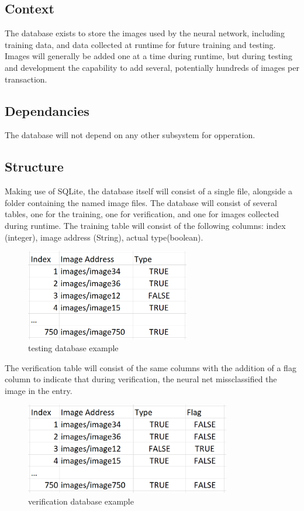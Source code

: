 \subsection{Context}
The database exists to store the images used by the neural network, including training data, and data collected at runtime for future training and testing. 
Images will generally be added one at a time during runtime, but during testing and development the capability to add several, potentially hundreds of images per transaction. 

\subsection{Dependancies} 
The database will not depend on any other subsystem for opperation.

\subsection{Structure}
Making use of SQLite, the database itself will consist of a single file, alongside a folder containing the named image files. 
The database will consist of several tables, one for the training, one for verification, and one for images collected during runtime. 
The training table will consist of the following columns: index (integer), image address (String), actual type(boolean). 

\begin{figure}[h]
\caption{testing database example}
\centering
\includegraphics[height=4cm]{testingdb}
\end{figure}

The verification table will consist of the same columns with the addition of a flag column to indicate that during verification, the neural net missclassified the image in the entry. 

\begin{figure}[h]
\caption{verification database example}
\centering
\includegraphics[height=4cm]{verificationdb}
\end{figure}


